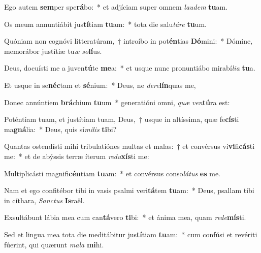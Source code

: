 \item Ego autem \textbf{sem}per spe\textbf{rá}bo:~* et adjíciam super omnem \textit{lau}\textit{dem} \textbf{tu}am.
\item Os meum annuntiábit jus\textbf{tí}tiam \textbf{tu}am:~* tota die salu\textit{tá}\textit{re} \textbf{tu}um.
\item Quóniam non cognóvi litteratúram,~† introíbo in pot\textbf{én}tias \textbf{Dó}mini:~* Dómine, memorábor justítiæ tu\textit{æ} \textit{so}\textbf{lí}us.
\item Deus, docuísti me a juven\textbf{tú}te \textbf{me}a:~* et usque nunc pronuntiábo mirabí\textit{li}\textit{a} \textbf{tu}a.
\item Et usque in se\textbf{néc}tam et \textbf{sé}nium:~* Deus, ne \textit{de}\textit{re}\textbf{lín}quas me,
\item Donec annúntiem \textbf{brá}chium \textbf{tu}um~* generatióni omni, \textit{quæ} \textit{ven}\textbf{tú}ra est:
\item Poténtiam tuam, et justítiam tuam, Deus,~† usque in altíssima, quæ fe\textbf{cís}ti ma\textbf{gná}lia:~* Deus, quis sí\textit{mi}\textit{lis} \textbf{ti}bi?
\item Quantas ostendísti mihi tribulatiónes multas et malas:~† et convérsus vi\textbf{vi}fi\textbf{cás}ti me:~* et de abýssis terræ íterum \textit{re}\textit{du}\textbf{xís}ti me:
\item Multiplicásti magnifi\textbf{cén}tiam \textbf{tu}am:~* et convérsus conso\textit{lá}\textit{tus} \textbf{es} me.
\item Nam et ego confitébor tibi in vasis psalmi veri\textbf{tá}tem \textbf{tu}am:~* Deus, psallam tibi in cíthara, \textit{Sanc}\textit{tus} \textbf{Is}raël.
\item Exsultábunt lábia mea cum can\textbf{tá}vero \textbf{ti}bi:~* et ánima mea, quam \textit{red}\textit{e}\textbf{mís}ti.
\item Sed et lingua mea tota die meditábitur jus\textbf{tí}tiam \textbf{tu}am:~* cum confúsi et revériti fúerint, qui quærunt \textit{ma}\textit{la} \textbf{mi}hi.
